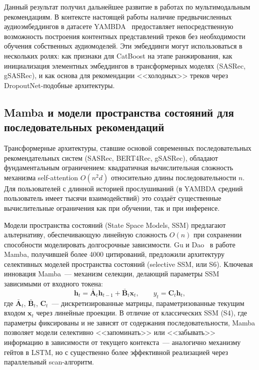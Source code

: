 Данный результат получил дальнейшее развитие в работах по мультимодальным рекомендациям. В контексте настоящей работы наличие предвычисленных аудиоэмбеддингов в датасете YAMBDA~\cite{yambda2025} предоставляет непосредственную возможность построения контентных представлений треков без необходимости обучения собственных аудиомоделей. Эти эмбеддинги могут использоваться в нескольких ролях: как признаки для CatBoost на этапе ранжирования, как инициализация элементных эмбеддингов в трансформерных моделях (SASRec, gSASRec), и как основа для рекомендации <<холодных>> треков через DropoutNet-подобные архитектуры.

\subsection{Mamba и модели пространства состояний для последовательных рекомендаций}

Трансформерные архитектуры, ставшие основой современных последовательных рекомендательных систем (SASRec, BERT4Rec, gSASRec), обладают фундаментальным ограничением: квадратичная вычислительная сложность механизма self-attention $O(n^2 d)$ относительно длины последовательности $n$. Для пользователей с длинной историей прослушиваний (в YAMBDA средний пользователь имеет тысячи взаимодействий) это создаёт существенные вычислительные ограничения как при обучении, так и при инференсе.

Модели пространства состояний (State Space Models, SSM) предлагают альтернативу, обеспечивающую линейную сложность $O(n)$ при сохранении способности моделировать долгосрочные зависимости. Gu и Dao~\cite{gu2023mamba} в работе Mamba, получившей более 4000 цитирований, предложили архитектуру селективных моделей пространства состояний (selective SSM, или S6). Ключевая инновация Mamba~--- механизм селекции, делающий параметры SSM зависимыми от входного токена:
\begin{equation}
    \mathbf{h}_t = \bar{\mathbf{A}}_t \mathbf{h}_{t-1} + \bar{\mathbf{B}}_t \mathbf{x}_t, \qquad y_t = \mathbf{C}_t \mathbf{h}_t,
\end{equation}
где $\bar{\mathbf{A}}_t$, $\bar{\mathbf{B}}_t$, $\mathbf{C}_t$~--- дискретизированные матрицы, параметризованные текущим входом $\mathbf{x}_t$ через линейные проекции. В отличие от классических SSM (S4), где параметры фиксированы и не зависят от содержания последовательности, Mamba позволяет модели селективно <<запоминать>> или <<забывать>> информацию в зависимости от текущего контекста~--- аналогично механизму гейтов в LSTM, но с существенно более эффективной реализацией через параллельный scan-алгоритм.

